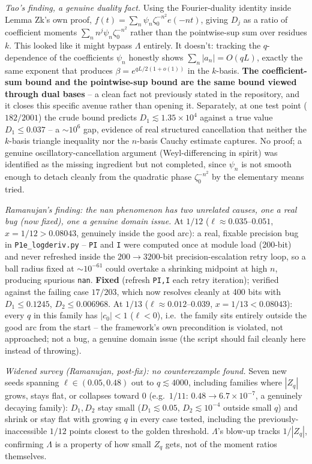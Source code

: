 \documentclass[11pt]{article}
\theoremstyle{remark}\newtheorem{remark}[theorem]{Remark}
\begin{document}
\emph{Tao's finding, a genuine duality fact.} Using the Fourier-duality identity inside Lemma
Zk's own proof, $f(t)=\sum_n\psi_n\zeta_0^{-n^2}e(-nt)$, giving $D_j$ as a ratio of coefficient
moments $\sum_n n^j\psi_n\zeta_0^{-n^2}$ rather than the pointwise-sup sum over residues $k$. This
looked like it might bypass $\Lambda$ entirely. It doesn't: tracking the $q$-dependence of the
coefficients $\psi_n$ honestly shows $\sum_n|a_n|=O(qL)$, exactly the same exponent that produces
$\beta=e^{qL/2(1+o(1))}$ in the $k$-basis. \textbf{The coefficient-sum bound and the pointwise-sup
bound are the same bound viewed through dual bases} -- a clean fact not previously stated in the
repository, and it closes this specific avenue rather than opening it. Separately, at one test
point ($182/2001$) the crude bound predicts $D_1\lesssim1.35\times10^4$ against a true value
$D_1\le0.037$ -- a $\sim10^6$ gap, evidence of real structured cancellation that neither the
$k$-basis triangle inequality nor the $n$-basis Cauchy estimate captures. No proof; a genuine
oscillatory-cancellation argument (Weyl-differencing in spirit) was identified as the missing
ingredient but not completed, since $\psi_n$ is not smooth enough to detach cleanly from the
quadratic phase $\zeta_0^{-n^2}$ by the elementary means tried.

\emph{Ramanujan's finding: the nan phenomenon has two unrelated causes, one a real bug (now fixed),
one a genuine domain issue.} At $1/12$ ($\ell\approx0.035$--$0.051$, $x=1/12>0.08043$, genuinely
inside the good arc): a real, fixable precision bug in \texttt{P1e\_logderiv.py} -- \texttt{PI} and
\texttt{I} were computed once at module load (200-bit) and never refreshed inside the
$200\to3200$-bit precision-escalation retry loop, so a ball radius fixed at $\sim10^{-61}$ could
overtake a shrinking midpoint at high $n$, producing spurious \texttt{nan}. \textbf{Fixed} (refresh
\texttt{PI,I} each retry iteration); verified against the failing case $17/203$, which now resolves
cleanly at 400 bits with $D_1\le0.1245$, $D_2\le0.006968$. At $1/13$ ($\ell\approx0.012$--$0.039$,
$x=1/13<0.08043$): every $q$ in this family has $|c_0|<1$ ($\ell<0$), i.e.\ the family sits
entirely outside the good arc from the start -- the framework's own precondition is violated, not
approached; not a bug, a genuine domain issue (the script should fail cleanly here instead of
throwing).

\emph{Widened survey (Ramanujan, post-fix): no counterexample found.} Seven new seeds spanning
$\ell\in(0.05,0.48)$ out to $q\lesssim4000$, including families where $|Z_q|$ grows, stays flat, or
collapses toward $0$ (e.g.\ $1/11$: $0.48\to6.7\times10^{-7}$, a genuinely decaying family): $D_1,
D_2$ stay small ($D_1\lesssim0.05$, $D_2\lesssim10^{-4}$ outside small $q$) and shrink or stay flat
with growing $q$ in every case tested, including the previously-inaccessible $1/12$ points closest
to the golden threshold. $\Lambda$'s blow-up tracks $1/|Z_q|$, confirming $\Lambda$ is a property
of how small $Z_q$ gets, not of the moment ratios themselves.
\end{document}

